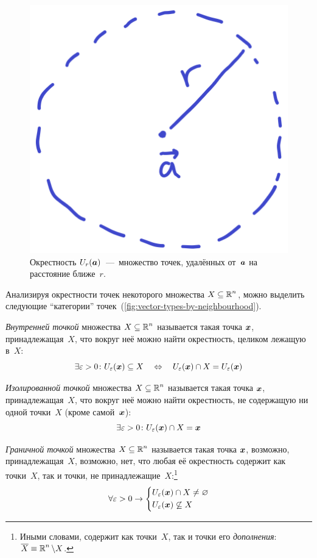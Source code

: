 \documentclass[a4paper,12pt]{article}
\begin{document}
  \begin{figure}[ht]
    \centering
  
    \includegraphics[width=0.25\columnwidth]{vector-neighbourhood}
  
    \caption{
      Окрестность $U_{r}(\boldsymbol a)$~---~множество точек, удалённых от~$\boldsymbol a$ на расстояние ближе~$r$.
    }
    \label{fig:vector-neighbourhood}
  \end{figure}

  Анализируя окрестности точек некоторого множества $X \hm\subseteq \RR^n$, можно выделить следующие ``категории'' точек~(\ref{fig:vector-types-by-neighbourhood}).

  \begin{definition}
    \emph{Внутренней точкой} множества $X \subseteq \operatorname{\mathbb R}^n$ называется такая точка $\boldsymbol x$, принадлежащая~$X$, что вокруг неё можно найти окрестность, целиком лежащую в~$X$:
    \[
      \exists \varepsilon > 0\colon U_{\varepsilon}(\boldsymbol x) \subseteq X \quad\Leftrightarrow\quad U_{\varepsilon}(\boldsymbol x) \cap X = U_{\varepsilon}(\boldsymbol x)
    \]
  \end{definition}

  \begin{definition}
    \emph{Изолированной точкой} множества $X \subseteq \operatorname{\mathbb R}^n$ называется такая точка $\boldsymbol x$, принадлежащая~$X$, что вокруг неё можно найти окрестность, не содержащую ни одной точки~$X$ (кроме самой~$\boldsymbol x$):
    \[
      \exists \varepsilon > 0\colon U_{\varepsilon}(\boldsymbol x) \cap X = \boldsymbol x
    \]
  \end{definition}

  \begin{definition}
    \emph{Граничной точкой} множества $X \subseteq \operatorname{\mathbb R}^n$ называется такая точка $\boldsymbol x$, возможно, принадлежащая~$X$, возможно, нет, что любая её окрестность содержит как точки~$X$, так и точки, не принадлежащие~$X$:\footnote{
      Иными словами, содержит как точки~$X$, так и точки его \emph{дополнения}: $\overline{X} \hm\equiv \RR^n \hm\setminus X$.
    }
    \[
      \forall \varepsilon > 0 \to \left\{
        \begin{aligned}
          &U_{\varepsilon}(\boldsymbol x) \cap X \not= \varnothing\\
          &U_{\varepsilon}(\boldsymbol x) \not\subseteq X
        \end{aligned}
      \right.
    \]
  \end{definition}
\end{document}
